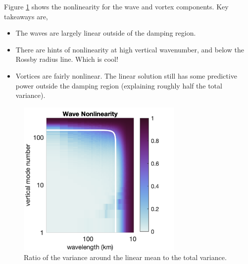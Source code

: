 \documentclass[10pt]{article}
\begin{document}
Figure \ref{WaveNonlinearity} shows the nonlinearity for the wave and vortex components. Key takeaways are,
\begin{itemize}
    \item The waves are largely linear outside of the damping region.
    \item There are hints of nonlinearity at high vertical wavenumber, and below the Rossby radius line. Which is cool!
    \item Vortices are fairly nonlinear. The linear solution still has some predictive power outside the damping region (explaining roughly half the total variance).
\end{itemize}

\begin{figure}[t]
  \centerline{\includegraphics[width=19pc,angle=0]{figures/WaveNonlinearity}}
  \caption{Ratio of the variance around the linear mean to the total variance.}
  \label{WaveNonlinearity}
\end{figure}
\end{document}
